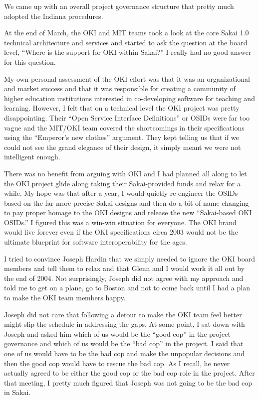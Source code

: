 \documentclass[12pt]{book}
\begin{document}
We came up with an overall project governance structure that pretty much adopted
the Indiana procedures.

At the end of March, the OKI and MIT teams took a look at the core Sakai
1.0 technical architecture and services and started to ask the question at the board level,
``Where is the support for OKI within Sakai?'' I really had no good answer
for this question.

My own personal assessment of the OKI effort was that
it was an organizational and market success and that it was responsible
for creating a community of higher education institutions interested in
co-developing software for teaching and learning.   However, I felt that
on a technical level the OKI project was pretty disappointing.
Their ``Open Service Interface Definitions'' or OSIDs
were far too vague and the MIT\slash OKI team covered
the shortcomings in their specifications
using the ``Emperor's new clothes'' argument.  They kept telling
us that if we could not see the grand elegance of their design, it
simply meant we were not intelligent enough.

There was no benefit from arguing with OKI and I had planned all along to
let the OKI project glide along taking their Sakai-provided
funds and relax for a while.  My hope was that
after a year, I would quietly re-engineer the OSIDs
based on the far more precise Sakai designs and then do a bit of
name changing to pay proper homage to the OKI designs and release
the new ``Sakai-based OKI OSIDs.''  I figured this was a win-win situation
for everyone.
The OKI brand would live forever
even if the OKI specifications circa 2003 would not be the ultimate
blueprint for software interoperability for the ages.

I tried to convince Joseph Hardin that we simply needed to ignore the
OKI board members and tell them to relax and that Glenn and I would work
it all out by the end of 2004.  Not surprisingly, Joseph did not agree
with my approach and told me to get on a plane, go to Boston and not
to come back until I had a plan to make the OKI team members happy.

Joseph did not care that following a detour to make the OKI
team feel better might slip the schedule in addressing
the gaps.  At some point, I sat down with Joseph and
asked him which of us would be the ``good cop''
in the project governance and which of us would be the
``bad cop'' in the project.  I said that one of us
would have to be the bad cop and make the unpopular
decisions and then the good cop would have to rescue
the bad cop.  As I recall, he never actually agreed to be either the
good cop or the bad cop role in the project.  After that meeting, I
pretty much figured that Joseph was not going to be the bad cop in Sakai.
\end{document}
